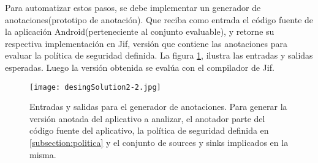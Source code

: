 Para automatizar estos pasos, se debe implementar un generador de
anotaciones(prototipo de anotación). Que reciba como entrada el código fuente de
la aplicación Android(perteneciente al conjunto evaluable), y retorne su
respectiva implementación en Jif, versión que contiene las anotaciones para
evaluar la política de seguridad definida.\newline
La figura \ref{fig:desingSolution}, ilustra las entradas y salidas
esperadas.\newline
Luego la versión obtenida se evalúa con el compilador de Jif.
\label{subsec:anotador}
\label{subsec:pasosSol}
\begin{figure}[t!]
	\begin{center}
	\texttt{[image: desingSolution2-2.jpg]}
	\end{center}
	\caption{Entradas y salidas para el generador de anotaciones.\newline
	Para generar la versión anotada del aplicativo a analizar, el anotador parte
	del código fuente del aplicativo, la política de seguridad definida en
	\ref{subsection:politica} y el conjunto de sources y sinks implicados en la misma.}
	\label{fig:desingSolution} 
\end{figure}

